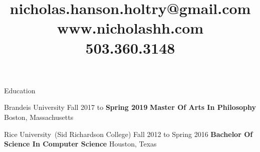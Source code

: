 \documentclass{resume}
\title{%
nicholas.hanson.holtry@gmail.com \\
www.nicholashh.com \\
503.360.3148}
\begin{document}
\begin{rSection}{Education}

  \begin{rSubSection}
  {Brandeis University}
  {Fall 2017 to \bf Spring 2019}
  {\bf Master Of Arts \normalfont In Philosophy}
  {Boston, Massachusetts}%
  \iftoggle{cv}{
    \item Thesis:~``TBD TBD TBD TBD TBD TBD TBD''
    \item Advisors: Berislav Maru{\v s}i{\' c}, Eli Hirsch
    \item Philosophy GPA:~\tab\tab{$4.00/4.00$}
    \item Overall GPA:~\tab\tab{$3.96/4.00$}
  }{
    \item GPA:~$3.93/4.00$
  }
  \end{rSubSection}

  \begin{rSubSection}
  {Rice University\normalfont~(Sid Richardson College)}
  {Fall 2012 to Spring 2016}
  {\bf Bachelor Of Science \normalfont In Computer Science}
  {Houston, Texas}%
  \iftoggle{cv}{
    \item Computer Science GPA:~\tab{$3.68/4.00$}
    \item Philosophy GPA:~\tab\tab{$3.56/4.00$}
    \item Overall GPA:~\tab\tab{$3.61/4.00$}
  }{
    \item GPA:~$3.61/4.00$
  }
  \end{rSubSection}










\end{rSection}
\end{document}
